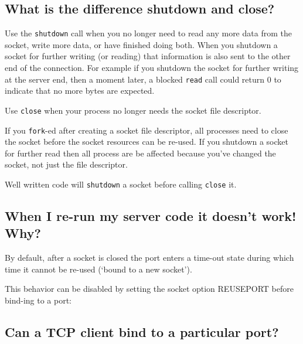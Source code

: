 \subsection{What is the difference shutdown and
close?}\label{what-is-the-difference-shutdown-and-close}

Use the \texttt{shutdown} call when you no longer need to read any more
data from the socket, write more data, or have finished doing both. When
you shutdown a socket for further writing (or reading) that information
is also sent to the other end of the connection. For example if you
shutdown the socket for further writing at the server end, then a moment
later, a blocked \texttt{read} call could return 0 to indicate that no
more bytes are expected.

Use \texttt{close} when your process no longer needs the socket file
descriptor.

If you \texttt{fork}-ed after creating a socket file descriptor, all
processes need to close the socket before the socket resources can be
re-used. If you shutdown a socket for further read then all process are
be affected because you've changed the socket, not just the file
descriptor.

Well written code will \texttt{shutdown} a socket before calling
\texttt{close} it.

\subsection{When I re-run my server code it doesn't work!
Why?}\label{when-i-re-run-my-server-code-it-doesnt-work-why}

By default, after a socket is closed the port enters a time-out state
during which time it cannot be re-used (`bound to a new socket').

This behavior can be disabled by setting the socket option REUSEPORT
before bind-ing to a port:

\begin{Shaded}
\begin{Highlighting}[]
     \NormalTok{;}

\end{Highlighting}
\end{Shaded}

\subsection{Can a TCP client bind to a particular
port?}\label{can-a-tcp-client-bind-to-a-particular-port}

